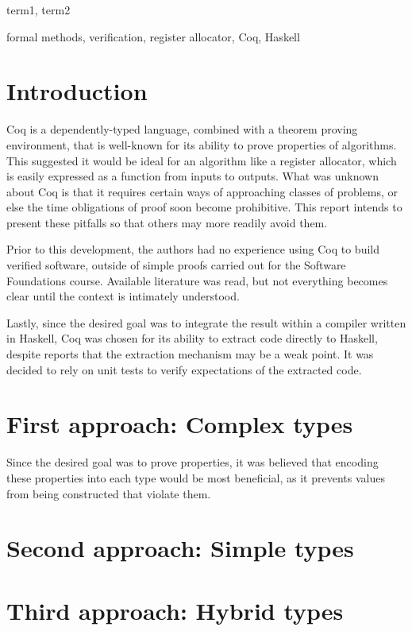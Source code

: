 \documentclass[preprint]{sigplanconf}
\begin{document}

\terms
term1, term2

\keywords
formal methods, verification, register allocator, Coq, Haskell

\section{Introduction}
\label{sec:intro}

Coq is a dependently-typed language, combined with a theorem proving
environment, that is well-known for its ability to prove properties of
algorithms. This suggested it would be ideal for an algorithm like a register
allocator, which is easily expressed as a function from inputs to outputs.
What was unknown about Coq is that it requires certain ways of approaching
classes of problems, or else the time obligations of proof soon become
prohibitive. This report intends to present these pitfalls so that others may
more readily avoid them.

Prior to this development, the authors had no experience using Coq to build
verified software, outside of simple proofs carried out for the Software
Foundations course. Available literature was read, but not everything becomes
clear until the context is intimately understood.

Lastly, since the desired goal was to integrate the result within a compiler
written in Haskell, Coq was chosen for its ability to extract code directly to
Haskell, despite reports that the extraction mechanism may be a weak point. It
was decided to rely on unit tests to verify expectations of the extracted
code.

\section{First approach: Complex types}

Since the desired goal was to prove properties, it was believed that encoding
these properties into each type would be most beneficial, as it prevents
values from being constructed that violate them.

\section{Second approach: Simple types}

\section{Third approach: Hybrid types}
\end{document}
